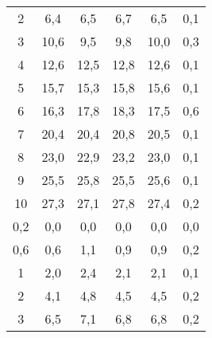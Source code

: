 \begin{table}[htp]
\begin{center}
\begin{tabular}{c|ccc|cc}
			2            &          6,4          &          6,5          &          6,7          &            6,5            &            0,1             \\
			3            &         10,6          &          9,5          &          9,8          &           10,0            &            0,3             \\
			4            &         12,6          &         12,5          &         12,8          &           12,6            &            0,1             \\
			5            &         15,7          &         15,3          &         15,8          &           15,6            &            0,1             \\
			6            &         16,3          &         17,8          &         18,3          &           17,5            &            0,6             \\
			7            &         20,4          &         20,4          &         20,8          &           20,5            &            0,1             \\
			8            &         23,0          &         22,9          &         23,2          &           23,0            &            0,1             \\
			9            &         25,5          &         25,8          &         25,5          &           25,6            &            0,1             \\
			10            &         27,3          &         27,1          &         27,8          &           27,4            &            0,2             \\ \hline
			0,2           &          0,0          &          0,0          &          0,0          &            0,0            &            0,0             \\
			0,6           &          0,6          &          1,1          &          0,9          &            0,9            &            0,2             \\
			1            &          2,0          &          2,4          &          2,1          &            2,1            &            0,1             \\
			2            &          4,1          &          4,8          &          4,5          &            4,5            &            0,2             \\
			3            &          6,5          &          7,1          &          6,8          &            6,8            &            0,2             \\

\end{tabular}
\end{center}
\end{table}
